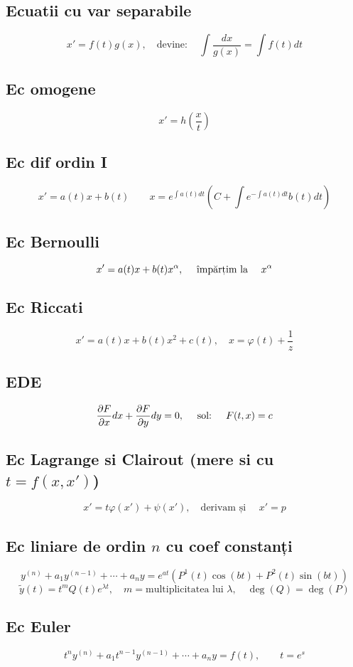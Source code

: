 \documentclass{article}
\newcommand{\parti}[2]{\frac{\partial #1}{ \partial #2}}
\begin{document}
\subsection*{Ecuatii cu var separabile}
\[ x' = f(t) g(x), \quad \mathrm{ devine: \quad} \int \frac{dx}{g(x)} = \int f(t) dt \]

\subsection*{Ec omogene}
\[x' = h\left(\frac{x}{t}\right)\]
\subsection*{Ec dif ordin I}
\[x' = a(t)x + b(t) \quad \quad x = e^{\int a(t)dt} \left( C + \int e^{-\int a(t) dt} b(t) dt \right)\]

\subsection*{Ec Bernoulli}
\[ x' = a(t)x + b(t) x^{\alpha}, \quad \text{ împărțim la \quad} x^{\alpha} \]
\subsection*{Ec Riccati}
\[ x' = a(t)x + b(t) x^2 + c(t), \quad x = \varphi(t) + \frac{1}{z} \]


\subsection*{EDE}
\[ \parti{F}{x} dx + \parti{F}{y} dy = 0, \quad \text{ sol: \quad} F(t, x) = c \]

\subsection*{Ec Lagrange si Clairout (mere si cu $t = f(x, x')$)}
\[ x' = t \varphi(x') + \psi(x'), \quad \text{derivam și } \quad x' = p \]

\subsection*{Ec liniare de ordin $n$ cu coef constanți}
\[ y^{(n)} + a_1 y^{(n-1)}+\cdots + a_ny = e^{at} \left( P^1(t) \cos(bt) + P^2(t) \sin(bt) \right)  \]
\[ \tilde{y} (t) = t^m Q(t)e^{\lambda t}, \quad m = \text{multiplicitatea lui } \lambda,\quad \deg(Q) = \deg(P)  \]

\subsection*{Ec Euler}
\[ t^ny^{(n)} + a_1 t^{n-1}  y^{(n-1)}+\cdots + a_ny = f(t), \quad \quad t = e^s  \]
\end{document}
